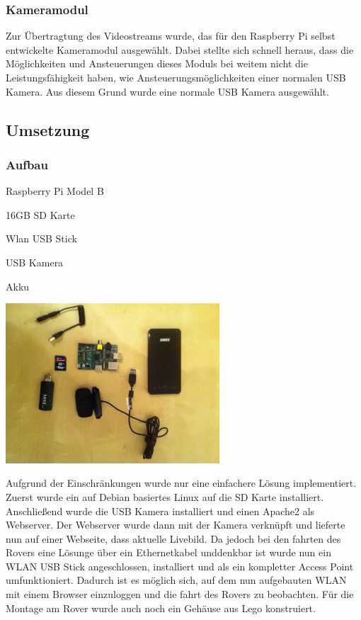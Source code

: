 \subsubsection{Kameramodul}

Zur Übertragtung des Videostreams wurde, das für den Raspberry Pi selbst entwickelte Kameramodul ausgewählt. Dabei stellte sich schnell heraus, dass die Möglichkeiten und Ansteuerungen dieses Moduls bei weitem nicht die Leistungsfähigkeit haben, wie Ansteuerungsmöglichkeiten einer normalen USB Kamera. Aus diesem Grund wurde eine normale USB Kamera ausgewählt.

\subsection{Umsetzung}

\subsubsection{Aufbau}
\begin{capitemize}[Komponenten]
	\item Raspberry Pi Model B
	\item 16GB SD Karte
	\item Wlan USB Stick
	\item USB Kamera
	\item Akku
\end{capitemize}

\begin{capfigure}[Komponenten]
	\includegraphics[width=8cm]{images/raspi/aufbau}
\end{capfigure}

Aufgrund der Einschränkungen wurde nur eine einfachere Lösung implementiert. Zuerst wurde ein auf Debian basiertes Linux auf die SD Karte installiert. Anschließend wurde die USB Kamera installiert und einen Apache2 als Webserver. Der Webserver wurde dann mit der Kamera verknüpft und lieferte nun auf einer Webseite, dass aktuelle Livebild.
Da jedoch bei den fahrten des Rovers eine Lösunge über ein Ethernetkabel unddenkbar ist wurde nun ein WLAN USB Stick angeschlossen, installiert und als ein kompletter Access Point umfunktioniert. Dadurch ist es möglich sich, auf dem nun aufgebauten WLAN mit einem Browser einzuloggen und die fahrt des Rovers zu beobachten. Für die Montage am Rover wurde auch noch ein Gehäuse aus Lego konstruiert.

